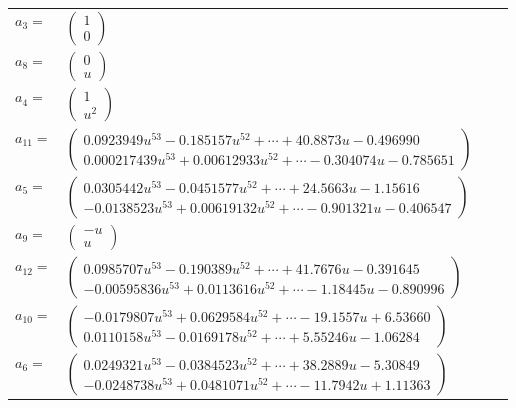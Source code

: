 \documentclass[1p]{elsarticle_modified}
\theoremstyle{definition}
\begin{document}
\begin{tabular}{m{7pt} m{180pt} m{7pt} m{180pt} }
\flushright $a_{3}=$&$\begin{pmatrix}1\\0\end{pmatrix}$ \\
\flushright $a_{8}=$&$\begin{pmatrix}0\\u\end{pmatrix}$ \\
\flushright $a_{4}=$&$\begin{pmatrix}1\\u^2\end{pmatrix}$ \\
\flushright $a_{11}=$&$\begin{pmatrix}0.0923949 u^{53}-0.185157 u^{52}+\cdots+40.8873 u-0.496990\\0.000217439 u^{53}+0.00612933 u^{52}+\cdots-0.304074 u-0.785651\end{pmatrix}$ \\
\flushright $a_{5}=$&$\begin{pmatrix}0.0305442 u^{53}-0.0451577 u^{52}+\cdots+24.5663 u-1.15616\\-0.0138523 u^{53}+0.00619132 u^{52}+\cdots-0.901321 u-0.406547\end{pmatrix}$ \\
\flushright $a_{9}=$&$\begin{pmatrix}- u\\u\end{pmatrix}$ \\
\flushright $a_{12}=$&$\begin{pmatrix}0.0985707 u^{53}-0.190389 u^{52}+\cdots+41.7676 u-0.391645\\-0.00595836 u^{53}+0.0113616 u^{52}+\cdots-1.18445 u-0.890996\end{pmatrix}$ \\
\flushright $a_{10}=$&$\begin{pmatrix}-0.0179807 u^{53}+0.0629584 u^{52}+\cdots-19.1557 u+6.53660\\0.0110158 u^{53}-0.0169178 u^{52}+\cdots+5.55246 u-1.06284\end{pmatrix}$ \\
\flushright $a_{6}=$&$\begin{pmatrix}0.0249321 u^{53}-0.0384523 u^{52}+\cdots+38.2889 u-5.30849\\-0.0248738 u^{53}+0.0481071 u^{52}+\cdots-11.7942 u+1.11363\end{pmatrix}$ \\

\end{tabular}
\end{document}
